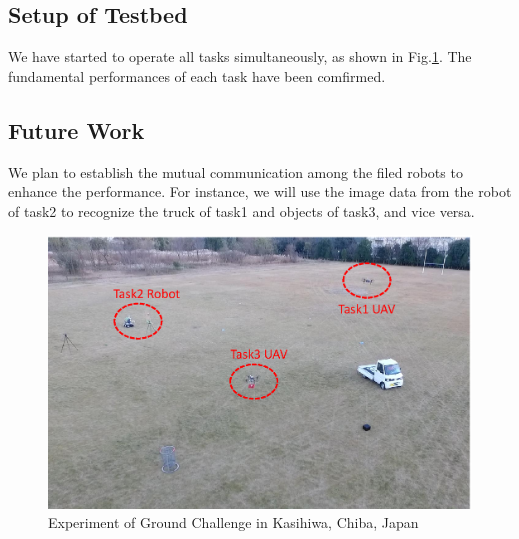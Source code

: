 \documentclass{standalone}
\begin{document}
\subsection{Setup of Testbed}
We have started to operate all tasks simultaneously, as shown in Fig.\ref{fig:grand}. The fundamental performances of each task have been comfirmed.

 \subsection{Future Work}
We plan to establish the mutual communication among the filed robots to enhance the performance. For instance, we will use the image data from the robot of task2 to recognize the truck of task1 and objects of task3, and vice versa.
 
\begin{figure}[h]
    \begin{center}
      \includegraphics[clip, bb= 0 0 560 360, width=1.0\columnwidth]{sections/grand/images/grand_challenge.eps}
    \end{center}
   \caption{Experiment of Ground Challenge in Kasihiwa, Chiba, Japan}
   \label{fig:grand}
 \end{figure}
\end{document}
